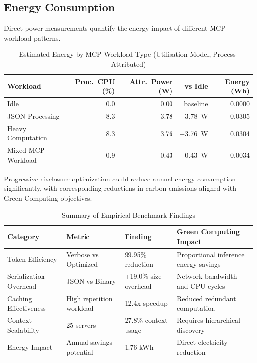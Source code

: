 \subsection{Energy Consumption}

Direct power measurements quantify the energy impact of different MCP workload patterns.


\begin{table}[h]
\centering
\caption{Estimated Energy by MCP Workload Type (Utilisation Model, Process-Attributed)}
\label{tab:energy_benchmark}
\begin{tabular}{lrrrr}
\toprule
\textbf{Workload} & \textbf{Proc.\ CPU (\%)} & \textbf{Attr.\ Power (W)} & \textbf{vs Idle} & \textbf{Energy (Wh)} \\
\midrule
Idle & 0.0 & 0.00 & baseline & 0.0000 \\
JSON Processing & 8.3 & 3.78 & +3.78~W & 0.0305 \\
Heavy Computation & 8.3 & 3.76 & +3.76~W & 0.0304 \\
Mixed MCP Workload & 0.9 & 0.43 & +0.43~W & 0.0034 \\
\bottomrule
\end{tabular}
\end{table}

Progressive disclosure optimization could reduce annual energy consumption significantly, with corresponding reductions in carbon emissions aligned with Green Computing objectives.


\begin{table}[t]
\centering
\caption{Summary of Empirical Benchmark Findings}
\label{tab:benchmark_summary}
\begin{tabular}{p{4cm}p{4cm}p{4cm}p{4cm}}
\toprule
\textbf{Category} & \textbf{Metric} & \textbf{Finding} & \textbf{Green Computing Impact} \\
\midrule
Token Efficiency & Verbose vs Optimized & 99.95\% reduction & Proportional inference energy savings \\
\addlinespace
Serialization Overhead & JSON vs Binary & +19.0\% size overhead & Network bandwidth and CPU cycles \\
\addlinespace
Caching Effectiveness & High repetition workload & 12.4x speedup & Reduced redundant computation \\
\addlinespace
Context Scalability & 25 servers & 27.8\% context usage & Requires hierarchical discovery \\
\addlinespace
Energy Impact & Annual savings potential & 1.76 kWh & Direct electricity reduction \\
\bottomrule
\end{tabular}
\end{table}
